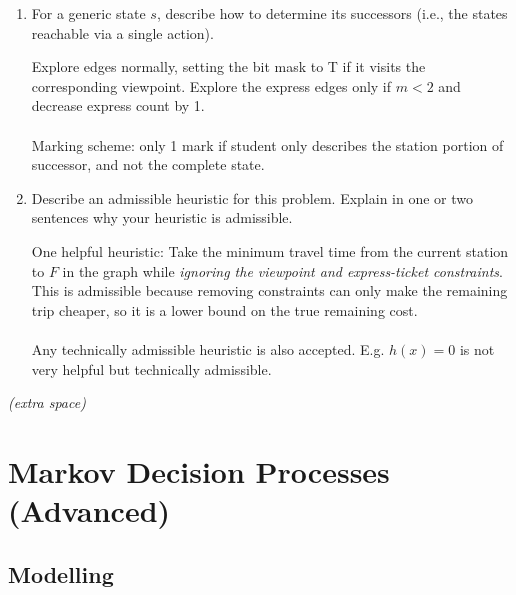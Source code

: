 \begin{enumerate}
\begin{enumerate}
  \item \points[2] For a generic state $s$, describe how to determine its successors
        (i.e., the states reachable via a single action).
  \begin{solution}
      Explore edges normally, setting the bit mask to T if it visits the corresponding viewpoint. Explore the express edges only if $m < 2$ and decrease express count by 1.
      \\~\\
      Marking scheme: only 1 mark if student only describes the station portion of successor, and not the complete state.
  \end{solution}

  \item \points[2] Describe an admissible heuristic for this problem.
        Explain in one or two sentences why your heuristic is admissible.
  \begin{solution}
  One helpful heuristic: Take the minimum travel time from the current station to $F$ in the graph while \textit{ignoring the viewpoint and express-ticket constraints}. This is admissible because removing constraints can only make the remaining trip cheaper, so it is a lower bound on the true remaining cost.
  \\~\\
  Any technically admissible heuristic is also accepted. E.g. $h(x)=0$ is not very helpful but technically admissible.
  \end{solution}

  \end{enumerate}

\end{enumerate}

\clearpage

\begin{center}
    \textit{(extra space)}
\end{center}

\clearpage

\section{\points[8] Markov Decision Processes (Advanced)}
\subsection{\points[8] Modelling}

